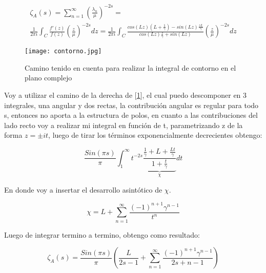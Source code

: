 \begin{equation}
\begin{array}{c}
   \zeta _A (s) =  \sum _{n=1} ^{\infty} \left( \frac{\lambda _n}{\mu} \right) ^{-2s} = \\ 
   \frac{1}{2 \pi i} \int _{C} \frac{f'(z)}{f(z)} \left( \frac{z}{\mu} \right) ^{-2s} dz =  
    \frac{1}{2 \pi i} \int _{C}
    \frac{ cos(L z) \left(L + \frac{1}{\gamma} \right) - sin(L z) \frac{z L}{\gamma}
    }
    {cos(L z) \frac{z}{\gamma} + sin(L z)
    }
    \left( \frac{z}{\mu} \right) ^{-2 s} dz
\end{array}
\end{equation}


\begin{figure}
\centering
\texttt{[image: contorno.jpg]}
\caption{Camino tenido en cuenta para realizar la integral de contorno en el plano complejo}
\label{fig:contorno}
\end{figure}


Voy a utilizar el camino de la derecha de [\ref{fig:contorno}], el cual puedo descomponer en 3 integrales, una angular y dos rectas, la contribución angular es regular para todo s, entonces no aporta a la estructura de polos, en cuanto a las contribuciones del lado recto voy a realizar mi integral en función de t, parametrizando z de la forma $z = \pm i  t$, luego de tirar los términos exponencialmente decrecientes obtengo:

\begin{equation}
    \frac{Sin(\pi s)}{ \pi } 
    \int _1 ^{\infty} 
    t ^{-2s}
    \underbrace
    {
	\frac{ \frac{1}{\gamma} + L + \frac{L t}{\gamma}}
	{1+ \frac{t}{\gamma}}
	} _{\chi}
    dt 
\label{contorno}
\end{equation}

En donde voy a insertar el desarrollo asintótico de   $\chi$. 

\begin{equation}
    \chi = L +  \sum _{n=1} ^{\infty} \frac{(-1) ^{n+1} \gamma ^{n-1} }{t ^n}
\label{eq:chi}
\end{equation}

Luego de integrar termino a termino, obtengo como resultado:

\begin{equation}
    \zeta _A (s) = 
    \frac{Sin(\pi s)}{\pi} 
    \left(
    \frac{L}{2s-1} + 
    \sum _{n=1} ^{\infty}
    \frac{(-1) ^{n+1} \gamma ^{n-1} }{2s+n-1}
    \right)
\label{eq.zeta.com}
\end{equation}

